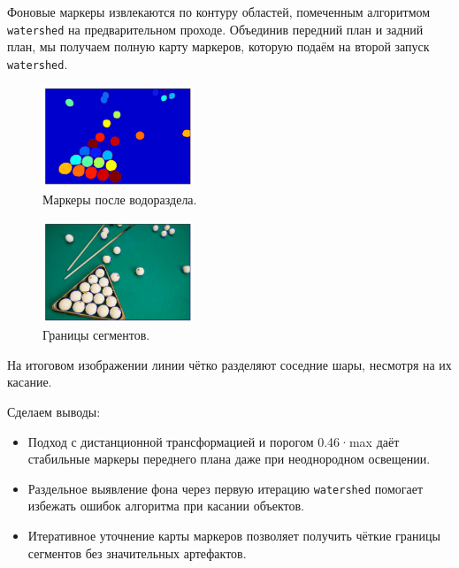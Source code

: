 \documentclass[a4paper,12pt]{article}
\begin{document}
Фоновые маркеры извлекаются по контуру областей, помеченным алгоритмом \texttt{watershed} на предварительном проходе. Объединив передний план и задний план, мы получаем полную карту маркеров, которую подаём на второй запуск \texttt{watershed}.

\begin{figure}[H]
    \centering
    \includegraphics[width=0.4\textwidth]{result/3_watershed_markers.png}
    \caption{Маркеры после водораздела.}
\end{figure}
\begin{figure}[H]
    \centering
    \includegraphics[width=0.4\textwidth]{result/3_result.png}
    \caption{Границы сегментов.}
\end{figure}

На итоговом изображении линии чётко разделяют соседние шары, несмотря на их касание.

Сделаем выводы:
\begin{itemize}
    \item Подход с дистанционной трансформацией и порогом 0.46·max даёт стабильные маркеры переднего плана даже при неоднородном освещении.
    \item Раздельное выявление фона через первую итерацию \texttt{watershed} помогает избежать ошибок алгоритма при касании объектов.
    \item Итеративное уточнение карты маркеров позволяет получить чёткие границы сегментов без значительных артефактов.
\end{itemize}
\end{document}

